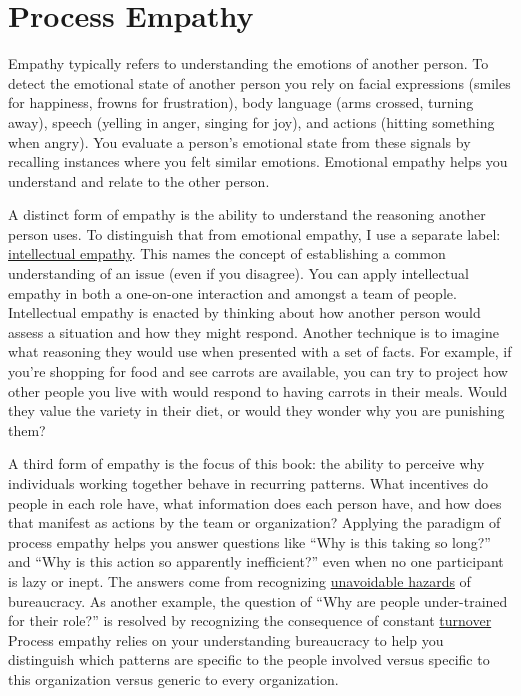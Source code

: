 \section{Process Empathy\label{sec:process-empathy}}

Empathy typically refers to understanding the emotions of another person. To detect the emotional state of another person you rely on facial expressions (smiles for happiness, frowns for frustration), body language (arms crossed, turning away), speech (yelling in anger, singing for joy), and actions (hitting something when angry). You evaluate a person's emotional state from these signals by recalling instances where you felt similar emotions. Emotional empathy helps you understand and relate to the other person. 

A distinct form of empathy is the ability to understand the reasoning another person uses. 
To distinguish that from emotional empathy, I use a separate label: 
\hyperref[sec:intellectual-empathy]{intellectual empathy}.
This names the concept of establishing a common understanding of an issue (even if you disagree). You can apply intellectual empathy in both a one-on-one interaction and amongst a team of people. Intellectual empathy is enacted by thinking about how another person would assess a situation and how they might respond. Another technique is to imagine what reasoning they would use when presented with a set of facts. For example, if you're shopping for food and see carrots are available, you can try to project how other people you live with would respond to having carrots in their meals. Would they value the variety in their diet, or would they wonder why you are punishing them?


A third form of empathy is the focus of this book: the ability to perceive why individuals working together behave in recurring patterns. What incentives do people in each role have, what information does each person have, and how does that manifest as actions by the team or organization? Applying the paradigm of \gls{process empathy} 
\iftoggle{glossaryinmargin}{\marginpar{[Glossary]}}{} helps you answer questions like ``Why is this taking so long?'' and ``Why is this action so apparently inefficient?'' even when no one participant is lazy or inept. The answers come from recognizing 
\hyperref[sec:unavoidable-hazards]{unavoidable hazards}\iftoggle{haspagenumbers}{ (see page~\pageref{sec:unavoidable-hazards})}{}
of bureaucracy. As another example, the question of ``Why are people under-trained for their role?'' is resolved by recognizing the consequence of  constant 
\hyperref[sec:turnover]{turnover}\iftoggle{haspagenumbers}{ (see page~\pageref{sec:turnover}).}{.}
Process empathy relies on your understanding bureaucracy to help you distinguish which patterns are specific to the people involved versus specific to this organization versus generic to every organization.

